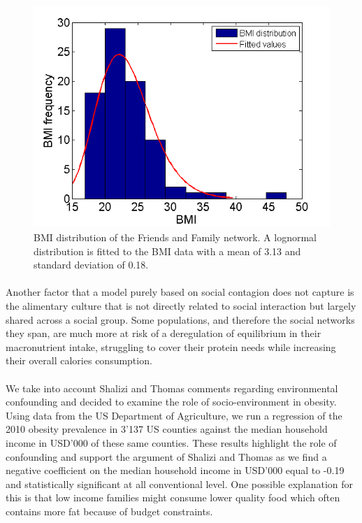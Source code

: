 \documentclass[11pt]{article}
\begin{document}
\begin{figure}[!h]
\center
   \includegraphics[scale = 0.9]{bmi_distribution_figure4.png}
   \caption{\label{4} BMI distribution of the Friends and Family network. A lognormal distribution is fitted to the BMI data with a mean of 3.13 and standard deviation of 0.18.}
\end{figure}


\paragraph{}

Another factor that a model purely based on social contagion does not capture is the alimentary culture that is not directly related to social interaction but largely shared across a social group. Some populations, and therefore the social networks they span, are much more at risk of a deregulation of equilibrium in their macronutrient intake, struggling to cover their protein needs while increasing their overall calories consumption. 

\paragraph{}
We take into account Shalizi and Thomas comments regarding environmental confounding and decided to examine the role of socio-environment in obesity. Using data from the US Department of Agriculture, we run a regression of the 2010 obesity prevalence in 3'137 US counties against the median household income in USD'000 of these same counties. These results highlight the role of confounding and support the argument of Shalizi and Thomas as we find a negative coefficient on the median household income in USD'000 equal to -0.19 and statistically significant at all conventional level. One possible explanation for this is that low income families might consume lower quality food which often contains more fat because of budget constraints.
\end{document}
